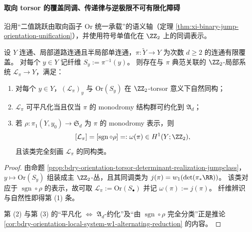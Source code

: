 \paragraph{取向 torsor 的覆盖同调、传递律与逆极限不可有限化障碍}
沿用“二值跳跃由取向函子 \(\mathrm{Or}\) 统一承载”的语义轴（定理 \ref{thm:xi-binary-jump-orientation-unification}），并使用符号单值化在 \(\ZZ_2\) 上的同调表示。

\begin{theorem}[二值跳跃类的上同调刻画与可消去性判别]\label{thm:xi-time-part9i-orientation-local-system-cohomology}
设 \(Y\) 连通、局部道路连通且半局部单连通，\(\pi:\widetilde Y\to Y\) 为次数 \(d\ge 2\) 的连通有限覆盖。
对每个 \(y\in Y\) 记纤维 \(S_y:=\pi^{-1}(y)\)。
则存在与 \(\pi\) 典范关联的 \(\ZZ_2\)-局部系统 \(\mathcal L_\pi\to Y\)，满足：
\begin{enumerate}
  \item 对每个 \(y\in Y\)，\((\mathcal L_\pi)_y\) 与 \(\mathrm{Or}(S_y)\) 在 \(\ZZ_2\)-torsor 意义下自然同构；
  \item \(\mathcal L_\pi\) 可平凡化当且仅当 \(\pi\) 的 monodromy 结构群可约化到 \(\mathfrak A_d\)；
  \item 若 \(\rho:\pi_1(Y,y_0)\to\mathfrak S_d\) 为 \(\pi\) 的 monodromy 表示，则
  \[
  [\mathcal L_\pi]=[\operatorname{sgn}\circ\rho]
  =: \omega(\pi)\in H^1(Y;\ZZ_2),
  \]
  且该类完全刻画 \(\mathcal L_\pi\) 的同构类。
\end{enumerate}
\end{theorem}
\begin{proof}
由命题 \ref{prop:bdry-orientation-torsor-determinant-realization-jumpclass}，
\(
y\mapsto \mathrm{Or}(S_y)
\)
组装成主 \(\ZZ_2\)-丛，且其同调类为
\(
j(\pi)=w_1(\det(\pi_\ast\RR))
\)。
该类对应于 \(\operatorname{sgn}\circ\rho\) 的表示，故可取
\(
\mathcal L_\pi:=\mathrm{Or}(S_\bullet)
\)
并记 \(\omega(\pi):=j(\pi)\)。
纤维辨识与自然性即得第 (1) 条。

第 (2) 与第 (3) 的“平凡化 \(\Leftrightarrow\) \(\mathfrak A_d\)-约化”及“由 \(\operatorname{sgn}\circ\rho\) 完全分类”正是推论
\ref{cor:bdry-orientation-local-system-w1-alternating-reduction}
的内容。
\end{proof}

